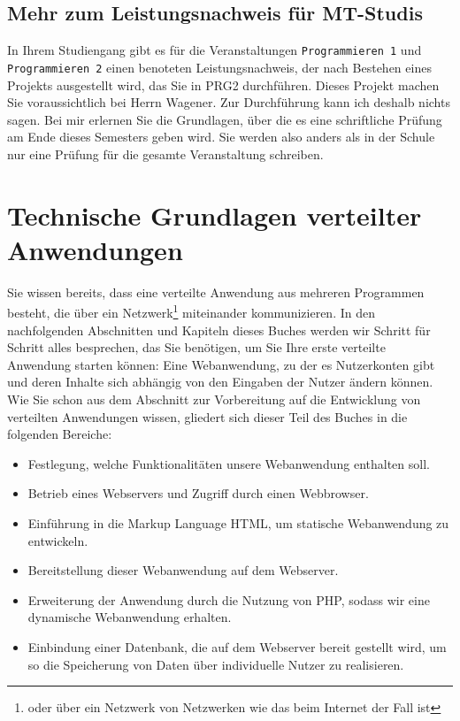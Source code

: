 \subsection{Mehr zum Leistungsnachweis für MT-Studis}

In Ihrem Studiengang gibt es für die Veranstaltungen \verb|Programmieren 1| und \verb|Programmieren 2| einen benoteten Leistungsnachweis, der nach Bestehen eines Projekts ausgestellt wird, das Sie in PRG2 durchführen. Dieses Projekt machen Sie voraussichtlich bei Herrn Wagener. Zur Durchführung kann ich deshalb nichts sagen. Bei mir erlernen Sie die Grundlagen, über die es eine schriftliche Prüfung am Ende dieses Semesters geben wird. Sie werden also anders als in der Schule nur eine Prüfung für die gesamte Veranstaltung schreiben.

\section{Technische Grundlagen verteilter Anwendungen}

Sie wissen bereits, dass eine verteilte Anwendung aus mehreren Programmen besteht, die über ein Netzwerk\footnote{oder über ein Netzwerk von Netzwerken wie das beim \glqq{}Internet\grqq{} der Fall ist}  miteinander kommunizieren. In den nachfolgenden Abschnitten und Kapiteln dieses Buches werden wir Schritt für Schritt alles besprechen, das Sie benötigen, um Sie Ihre erste verteilte Anwendung starten können: Eine Webanwendung, zu der es Nutzerkonten gibt und deren Inhalte sich abhängig von den Eingaben der Nutzer ändern können. \\

Wie Sie schon aus dem Abschnitt zur Vorbereitung auf die Entwicklung von verteilten Anwendungen wissen, gliedert sich dieser Teil des Buches in die folgenden Bereiche:\\

\begin{itemize}
	\item Festlegung, welche Funktionalitäten unsere Webanwendung enthalten soll.
	\item Betrieb eines Webservers und Zugriff durch einen Webbrowser.
	\item Einführung in die Markup Language HTML, um statische Webanwendung zu entwickeln.
	\item Bereitstellung dieser Webanwendung auf dem Webserver.
	\item Erweiterung der Anwendung durch die Nutzung von PHP, sodass wir eine dynamische Webanwendung erhalten.
	\item Einbindung einer Datenbank, die auf dem Webserver bereit gestellt wird, um so die Speicherung von Daten über individuelle Nutzer zu realisieren.
\end{itemize}

